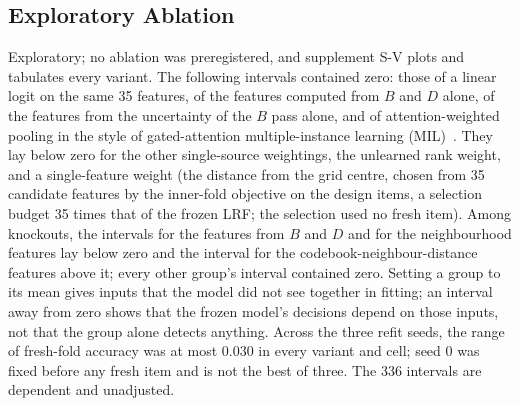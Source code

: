\subsection{Exploratory Ablation}\label{sec:study2-ablation}
Exploratory; no ablation was preregistered, and supplement S-V plots and tabulates every variant.
The following intervals contained zero: those of a linear logit on the same 35 features, of the features computed from $B$ and $D$ alone,
of the features from the uncertainty of the $B$ pass alone, and of attention-weighted pooling in the style of gated-attention
multiple-instance learning (MIL)~\cite{ilse2018attention}.
They lay below zero for the other single-source weightings, the unlearned rank weight, and a single-feature weight (the distance from the
grid centre, chosen from 35 candidate features by the inner-fold objective on the design items, a selection budget 35 times that of the
frozen LRF; the selection used no fresh item).
Among knockouts, the intervals for the features from $B$ and $D$ and for the neighbourhood features lay below zero and the interval for the
codebook-neighbour-distance features above it; every other group's interval contained zero.
Setting a group to its mean gives inputs that the model did not see together in fitting; an interval away from zero shows that the frozen
model's decisions depend on those inputs, not that the group alone detects anything.
Across the three refit seeds, the range of fresh-fold accuracy was at most 0.030 in every variant and cell; seed 0 was fixed before any
fresh item and is not the best of three.
The 336 intervals are dependent and unadjusted.


